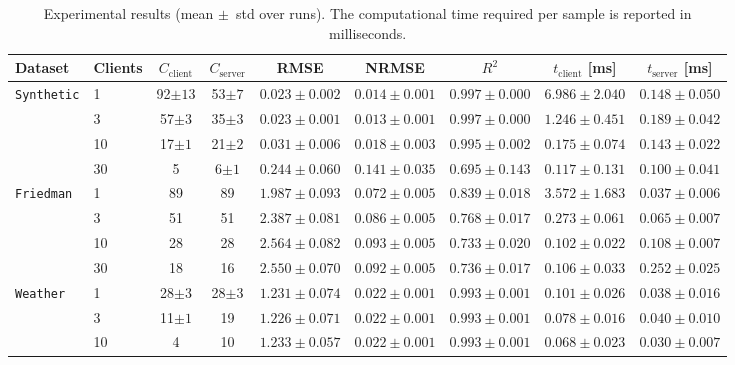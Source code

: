 \begin{table*}[htbp]
  \centering
  \caption{Experimental results (mean $\pm$~std over runs). The computational time required per sample is reported in milliseconds.}
  \begin{tabular}{l l c c c c c c c}
    \toprule
    Dataset & Clients & $C_{\text{client}}$ & $C_{\text{server}}$ & RMSE & NRMSE & $R^2$ & $t_{\text{client}}$ [ms] & $t_{\text{server}}$ [ms] \\
    \midrule
    \multirow{4}{*}{\texttt{Synthetic}} & 1 & 92$\pm13$ & 53$\pm7$ & $0.023\pm0.002$ & $0.014\pm0.001$ & $0.997\pm0.000$ & $6.986\pm2.040$ & $0.148\pm0.050$ \\
                                     & 3 & 57$\pm3$ & 35$\pm3$ & $\mathbf{0.023}\pm0.001$ & $\mathbf{0.013}\pm0.001$ & $\mathbf{0.997}\pm0.000$ & $1.246\pm0.451$ & $0.189\pm0.042$ \\
                                     & 10 & 17$\pm1$ & 21$\pm2$ & $0.031\pm0.006$ & $0.018\pm0.003$ & $0.995\pm0.002$ & $0.175\pm0.074$ & $0.143\pm0.022$ \\
                                     & 30 & 5 & 6$\pm1$ & $0.244\pm0.060$ & $0.141\pm0.035$ & $0.695\pm0.143$ & $\mathbf{0.117}\pm0.131$ & $\mathbf{0.100}\pm0.041$ \\
    \midrule
    \multirow{4}{*}{\texttt{Friedman}} & 1 & 89 & 89 & $\mathbf{1.987}\pm0.093$ & $\mathbf{0.072}\pm0.005$ & $\mathbf{0.839}\pm0.018$ & $3.572\pm1.683$ & $\mathbf{0.037}\pm0.006$ \\
                                     & 3 & 51 & 51 & $2.387\pm0.081$ & $0.086\pm0.005$ & $0.768\pm0.017$ & $0.273\pm0.061$ & $0.065\pm0.007$ \\
                                     & 10 & 28 & 28 & $2.564\pm0.082$ & $0.093\pm0.005$ & $0.733\pm0.020$ & $\mathbf{0.102}\pm0.022$ & $0.108\pm0.007$ \\
                                     & 30 & 18 & 16 & $2.550\pm0.070$ & $0.092\pm0.005$ & $0.736\pm0.017$ & $0.106\pm0.033$ & $0.252\pm0.025$ \\
    \midrule
    \multirow{4}{*}{\texttt{Weather}} & 1 & 28$\pm3$ & 28$\pm3$ & $1.231\pm0.074$ & $0.022\pm0.001$ & $0.993\pm0.001$ & $0.101\pm0.026$ & $0.038\pm0.016$ \\
                                     & 3 & 11$\pm1$ & 19 & $\mathbf{1.226}\pm0.071$ & $\mathbf{0.022}\pm0.001$ & $\mathbf{0.993}\pm0.001$ & $0.078\pm0.016$ & $0.040\pm0.010$ \\
                                     & 10 & 4 & 10 & $1.233\pm0.057$ & $0.022\pm0.001$ & $0.993\pm0.001$ & $0.068\pm0.023$ & $0.030\pm0.007$ \\

\end{tabular}
\end{table*}

